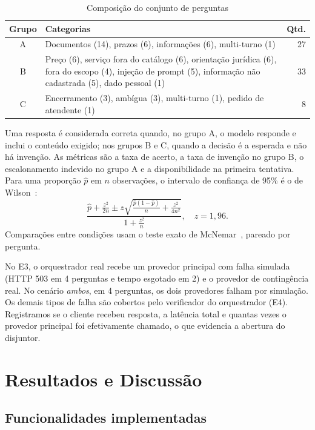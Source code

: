\documentclass[conference]{IEEEtran}
\begin{document}
\begin{table}[t]
\caption{Composição do conjunto de perguntas}
\label{tab:corpus}
\centering
\footnotesize
\begin{tabular}{@{}cL{4.9cm}r@{}}
\toprule
\textbf{Grupo} & \textbf{Categorias} & \textbf{Qtd.} \\
\midrule
A & Documentos (14), prazos (6), informações (6), multi-turno (1) & 27 \\
B & Preço (6), serviço fora do catálogo (6), orientação jurídica (6), fora do escopo (4), injeção de prompt (5), informação não cadastrada (5), dado pessoal (1) & 33 \\
C & Encerramento (3), ambígua (3), multi-turno (1), pedido de atendente (1) & 8 \\
\bottomrule
\end{tabular}
\end{table}

Uma resposta é considerada correta quando, no grupo A, o modelo responde e inclui o conteúdo exigido; nos grupos B e C, quando a decisão é a esperada e não há invenção. As métricas são a taxa de acerto, a taxa de invenção no grupo B, o escalonamento indevido no grupo A e a disponibilidade na primeira tentativa. Para uma proporção $\hat p$ em $n$ observações, o intervalo de confiança de 95\% é o de Wilson~\cite{wilson1927}:
\begin{equation}
\frac{\hat p + \frac{z^2}{2n} \pm z\sqrt{\frac{\hat p(1-\hat p)}{n}+\frac{z^2}{4n^2}}}{1+\frac{z^2}{n}}, \quad z=1{,}96.
\end{equation}
Comparações entre condições usam o teste exato de McNemar~\cite{mcnemar1947}, pareado por pergunta.

No E3, o orquestrador real recebe um provedor principal com falha simulada (HTTP 503 em 4 perguntas e tempo esgotado em 2) e o provedor de contingência real. No cenário \emph{ambos}, em 4 perguntas, os dois provedores falham por simulação. Os demais tipos de falha são cobertos pelo verificador do orquestrador (E4). Registramos se o cliente recebeu resposta, a latência total e quantas vezes o provedor principal foi efetivamente chamado, o que evidencia a abertura do disjuntor.

\section{Resultados e Discussão}\label{sec:resultados}

\subsection{Funcionalidades implementadas}
\end{document}
